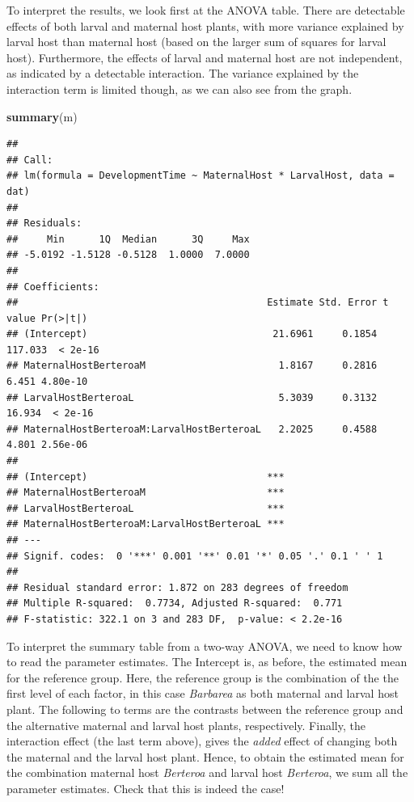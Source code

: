 \documentclass[
]{article}
\newenvironment{Shaded}{\begin{snugshade}}{\end{snugshade}}
\newcommand{\FunctionTok}[1]{\textcolor[rgb]{0.13,0.29,0.53}{\textbf{#1}}}
\newcommand{\NormalTok}[1]{#1}
\begin{document}
To interpret the results, we look first at the ANOVA table. There are
detectable effects of both larval and maternal host plants, with more
variance explained by larval host than maternal host (based on the
larger sum of squares for larval host). Furthermore, the effects of
larval and maternal host are not independent, as indicated by a
detectable interaction. The variance explained by the interaction term
is limited though, as we can also see from the graph.

\newpage

\begin{Shaded}
\begin{Highlighting}[]
\FunctionTok{summary}\NormalTok{(m)}
\end{Highlighting}
\end{Shaded}

\begin{verbatim}
## 
## Call:
## lm(formula = DevelopmentTime ~ MaternalHost * LarvalHost, data = dat)
## 
## Residuals:
##     Min      1Q  Median      3Q     Max 
## -5.0192 -1.5128 -0.5128  1.0000  7.0000 
## 
## Coefficients:
##                                           Estimate Std. Error t value Pr(>|t|)
## (Intercept)                                21.6961     0.1854 117.033  < 2e-16
## MaternalHostBerteroaM                       1.8167     0.2816   6.451 4.80e-10
## LarvalHostBerteroaL                         5.3039     0.3132  16.934  < 2e-16
## MaternalHostBerteroaM:LarvalHostBerteroaL   2.2025     0.4588   4.801 2.56e-06
##                                              
## (Intercept)                               ***
## MaternalHostBerteroaM                     ***
## LarvalHostBerteroaL                       ***
## MaternalHostBerteroaM:LarvalHostBerteroaL ***
## ---
## Signif. codes:  0 '***' 0.001 '**' 0.01 '*' 0.05 '.' 0.1 ' ' 1
## 
## Residual standard error: 1.872 on 283 degrees of freedom
## Multiple R-squared:  0.7734, Adjusted R-squared:  0.771 
## F-statistic: 322.1 on 3 and 283 DF,  p-value: < 2.2e-16
\end{verbatim}

To interpret the summary table from a two-way ANOVA, we need to know how
to read the parameter estimates. The Intercept is, as before, the
estimated mean for the reference group. Here, the reference group is the
combination of the the first level of each factor, in this case
\emph{Barbarea} as both maternal and larval host plant. The following to
terms are the contrasts between the reference group and the alternative
maternal and larval host plants, respectively. Finally, the interaction
effect (the last term above), gives the \emph{added} effect of changing
both the maternal and the larval host plant. Hence, to obtain the
estimated mean for the combination maternal host \emph{Berteroa} and
larval host \emph{Berteroa}, we sum all the parameter estimates. Check
that this is indeed the case!
\end{document}
